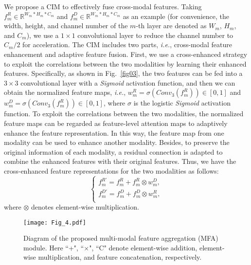 \documentclass[10pt,twocolumn,letterpaper]{article}
\def\ie{\emph{i.e.}}
\begin{document}
We propose a CIM to effectively fuse cross-modal features. Taking $f_{m}^{R}\in\mathbb{R}^{W_m*H_m*C_m}$ and $f_{m}^{D}\in\mathbb{R}^{W_m*H_m*C_m}$ as an example (for convenience, the width, height, and channel number of the $m$-th layer are denoted as $W_m$, $H_m$, and $C_m$),
we use a $1\times1$ convolutional layer to reduce the channel number to $C_m/2$ for acceleration. The CIM includes two parts, \ie, cross-modal feature enhancement and adaptive feature fusion. First, we use a cross-enhanced strategy to exploit the correlations between the two modalities by learning their enhanced features. Specifically, as shown in Fig.~\ref{fig03}, the two features can be fed into a $3\times{3}$ convolutional layer with a \emph{Sigmoid} activation function, and then we can obtain the normalized feature maps, \ie,
$w_m^{R}=\sigma(Conv_3(f_{m}^{R}))\in[0,1]$ and $w_m^{D}=\sigma(Conv_3(f_{m}^{R}))\in[0,1]$,
where $\sigma$ is the logistic \emph{Sigmoid} activation function. To exploit the correlations between the two modalities, the normalized feature maps can be regarded as feature-level attention maps to adaptively enhance the feature representation. In this way, the feature map from one modality can be used to enhance another modality. Besides, to preserve the original information of each modality, a residual connection is adapted to combine the enhanced features with their original features. Thus, we have the cross-enhanced feature representations for the two modalities as follows: \begin{equation}
\left\{
\begin{aligned}
f_m^{R'}=f_{m}^{R}+f_{m}^{R}\otimes{w_m^{D}} ,\\
f_m^{D'}=f_{m}^{D}+f_{m}^{D}\otimes{w_m^{R}} ,\\
\end{aligned}
\right.
\end{equation}
where $\otimes$ denotes element-wise multiplication.


\begin{figure}
	\begin{centering}
		\texttt{[image: Fig\_4.pdf]}
		\caption{Diagram of the proposed multi-modal feature aggregation (MFA) module. Here ``+", ``$\times$", ``C" denote element-wise addition, element-wise multiplication, and feature concatenation, respectively.}
		\label{fig04}
	\end{centering}
\end{figure}
\end{document}
